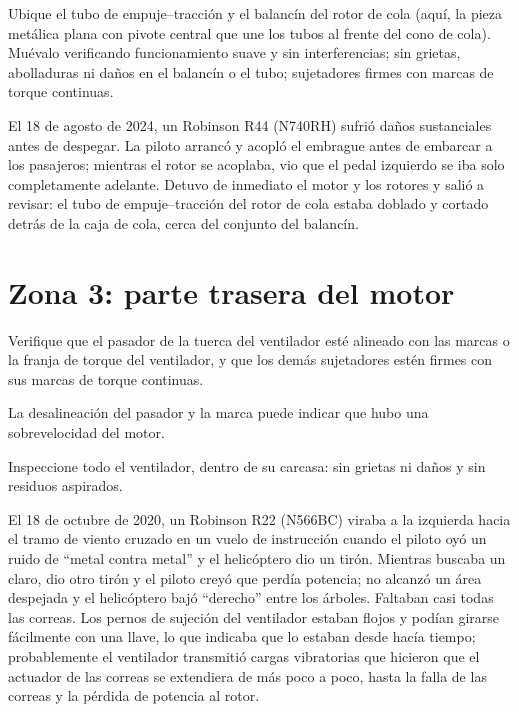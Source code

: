 Ubique el tubo de empuje--tracción y el balancín del rotor de cola (aquí, la pieza metálica plana con pivote central que une los tubos al frente del cono de cola). Muévalo verificando funcionamiento suave y sin interferencias; sin grietas, abolladuras ni daños en el balancín o el tubo; sujetadores firmes con marcas de torque continuas.

\begin{caso}
El 18 de agosto de 2024, un Robinson R44 (N740RH) sufrió daños sustanciales antes de despegar. La piloto arrancó y acopló el embrague antes de embarcar a los pasajeros; mientras el rotor se acoplaba, vio que el pedal izquierdo se iba solo completamente adelante. Detuvo de inmediato el motor y los rotores y salió a revisar: el tubo de empuje--tracción del rotor de cola estaba doblado y cortado detrás de la caja de cola, cerca del conjunto del balancín.
\end{caso}

\section{Zona 3: parte trasera del motor}

Verifique que el pasador de la tuerca del ventilador esté alineado con las marcas o la franja de torque del ventilador, y que los demás sujetadores estén firmes con sus marcas de torque continuas.

\begin{nota}
La desalineación del pasador y la marca puede indicar que hubo una sobrevelocidad del motor.
\end{nota}

Inspeccione todo el ventilador, dentro de su carcasa: sin grietas ni daños y sin residuos aspirados.

\begin{caso}
El 18 de octubre de 2020, un Robinson R22 (N566BC) viraba a la izquierda hacia el tramo de viento cruzado en un vuelo de instrucción cuando el piloto oyó un ruido de ``metal contra metal'' y el helicóptero dio un tirón. Mientras buscaba un claro, dio otro tirón y el piloto creyó que perdía potencia; no alcanzó un área despejada y el helicóptero bajó ``derecho'' entre los árboles. Faltaban casi todas las correas. Los pernos de sujeción del ventilador estaban flojos y podían girarse fácilmente con una llave, lo que indicaba que lo estaban desde hacía tiempo; probablemente el ventilador transmitió cargas vibratorias que hicieron que el actuador de las correas se extendiera de más poco a poco, hasta la falla de las correas y la pérdida de potencia al rotor.
\end{caso}

